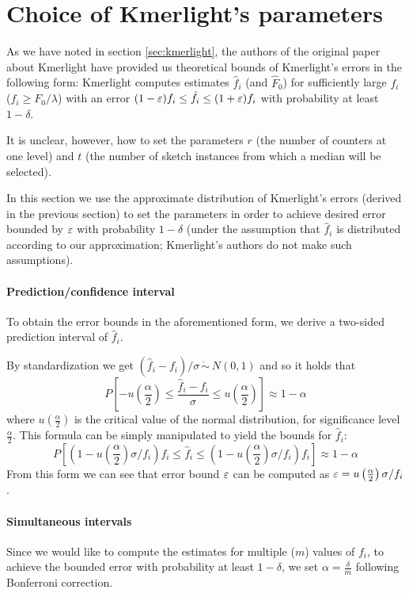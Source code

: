 \section{Choice of Kmerlight's parameters}
\label{sec:parameters-choice}

As we have noted in section \ref{sec:kmerlight},
the authors of the original paper about Kmerlight \cite{Sivadasan2016} have
provided us theoretical bounds of Kmerlight's errors in the following form:
Kmerlight computes estimates $\hat f_i$ (and $\hat F_0$) for sufficiently large
$f_i$ ($f_i \geq F_0 / \lambda$) with an error $(1-\varepsilon)f_i \leq \hat f_i \leq (1+\varepsilon)f_i$
with probability at least $1 - \delta$.

It is unclear, however, how to set the parameters $r$ (the number of counters at one level) 
and $t$ (the number of sketch instances from which a median will be selected).

In this section we use the approximate distribution of Kmerlight's errors (derived in the
previous section) to set the parameters in order to achieve
desired error bounded by $\varepsilon$ with probability $1-\delta$ (under the assumption that 
$\hat f_i$ is distributed according to our approximation; Kmerlight's authors do not make
such assumptions).

\paragraph{Prediction/confidence interval} To obtain the error bounds
in the aforementioned form, we derive a two-sided prediction interval of $\hat f_i$. 

By standardization we get $(\hat f_i - f_i)/\sigma \,\dot\sim\, N(0,1)$ and so it holds that
$$P\left[-u\left(\frac{\alpha}{2}\right) \leq 
\frac{\hat f_i - f_i}{\sigma} \leq 
u\left(\frac{\alpha}{2}\right) \right] \approx 1 - \alpha$$
where $u\left(\frac{\alpha}{2}\right)$ is the critical value of the normal distribution,
for significance level $\frac{\alpha}{2}$. This formula can be simply
manipulated to yield the bounds for $\hat f_i$:
$$P\left[\left(1-u\left(\frac{\alpha}{2}\right)\sigma/f_i\right) f_i \leq \hat f_i \leq \left(1-u\left(\frac{\alpha}{2}\right)\sigma/f_i\right) f_i \right] \approx 1 - \alpha$$
From this form we can see that error bound $\varepsilon$ can be computed as
$\varepsilon = u\left(\frac{\alpha}{2}\right)\sigma/f_i$.

\paragraph{Simultaneous intervals} Since we would like to compute the estimates
for multiple ($m$) values of $f_i$, to achieve the bounded error with probability at least
$1 - \delta$, we set $\alpha = \frac{\delta}{m}$ following Bonferroni correction.

